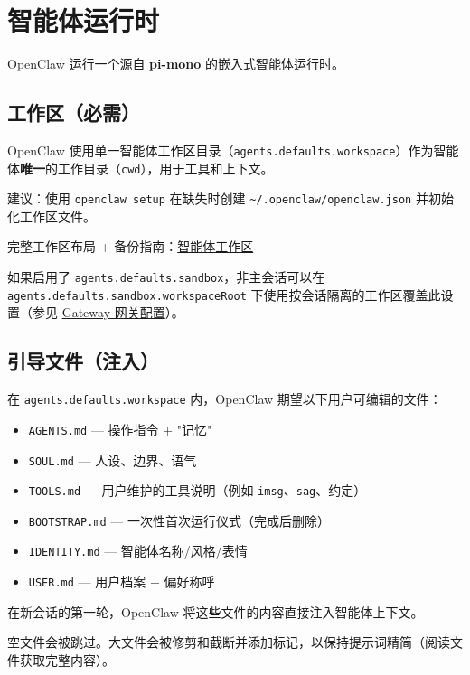\clearpage

\section{智能体运行时}


OpenClaw 运行一个源自 \textbf{pi-mono} 的嵌入式智能体运行时。

\subsection{工作区（必需）}


OpenClaw 使用单一智能体工作区目录（\texttt{agents.defaults.workspace}）作为智能体\textbf{唯一}的工作目录（\texttt{cwd}），用于工具和上下文。

建议：使用 \texttt{openclaw setup} 在缺失时创建 \texttt{\textasciitilde{}/.openclaw/openclaw.json} 并初始化工作区文件。

完整工作区布局 + 备份指南：\href{/concepts/agent-workspace}{智能体工作区}

如果启用了 \texttt{agents.defaults.sandbox}，非主会话可以在 \texttt{agents.defaults.sandbox.workspaceRoot} 下使用按会话隔离的工作区覆盖此设置（参见 \href{/gateway/configuration}{Gateway 网关配置}）。

\subsection{引导文件（注入）}


在 \texttt{agents.defaults.workspace} 内，OpenClaw 期望以下用户可编辑的文件：

\begin{itemize}
  \item \texttt{AGENTS.md} — 操作指令 + "记忆"
  \item \texttt{SOUL.md} — 人设、边界、语气
  \item \texttt{TOOLS.md} — 用户维护的工具说明（例如 \texttt{imsg}、\texttt{sag}、约定）
  \item \texttt{BOOTSTRAP.md} — 一次性首次运行仪式（完成后删除）
  \item \texttt{IDENTITY.md} — 智能体名称/风格/表情
  \item \texttt{USER.md} — 用户档案 + 偏好称呼
\end{itemize}


在新会话的第一轮，OpenClaw 将这些文件的内容直接注入智能体上下文。

空文件会被跳过。大文件会被修剪和截断并添加标记，以保持提示词精简（阅读文件获取完整内容）。

